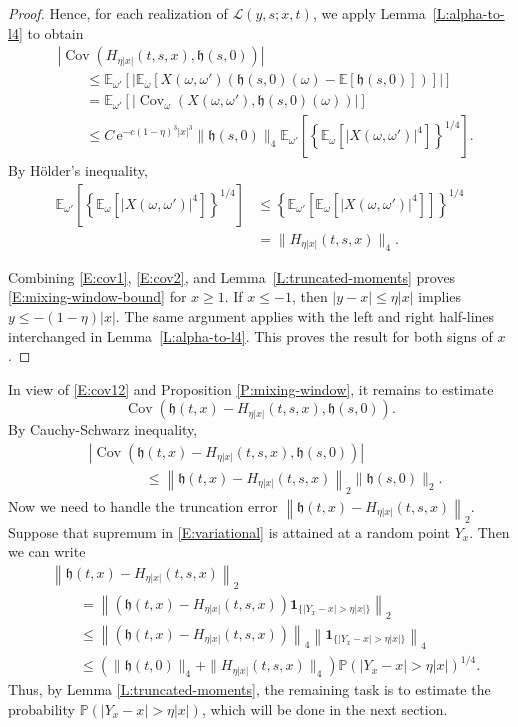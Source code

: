\documentclass[12pt, reqno]{amsart}
\numberwithin{equation}{section}
\theoremstyle{definition}
\newcommand{\E}{\mathbb{E}}
\newcommand{\h}{\mathfrak{h}}
\newcommand{\Cov}{\operatorname{Cov}}
\newcommand{\Prob}{\mathbb{P}}
\newcommand{\e}{\,\mathrm{e}}
\newcommand{\Lcal}{\mathcal{L}}
\newcommand{\one}{\mathbf{1}}
\begin{document}
\begin{proof}
           
  Hence, for each realization of $\Lcal(y,s;x,t)$, we apply
  Lemma~\ref{L:alpha-to-l4} to obtain
  \begin{align}
  &\left|\Cov(H_{\eta|x|}(t,s, x),\h(s,0))\right| \nonumber\\
  &\qquad \leq \E_{\omega'}\left[\left|\E_{\omega}\left[X(\omega, \omega') (\h(s,0)(\omega)-\E[\h(s,0)])\right]\right| \right] \nonumber\\
  &\qquad = \E_{\omega'} \left[\left|\Cov_{\omega} (X(\omega, \omega'), \h(s,0)(\omega))\right|\right]\nonumber\\
  &\qquad \leq C\e^{-c(1-\eta)^3|x|^3} \|\h(s,0)\|_4 \E_{\omega'}\left[
  \left\{\E_{\omega}\left[\left|X(\omega, \omega')\right|^4\right]\right\}^{1/4}
  \right]. \label{E:cov1}
  \end{align}
  By H\"older's inequality,
  \begin{align}
  \E_{\omega'}\left[
  \left\{\E_{\omega}\left[\left|X(\omega,\omega')\right|^4\right]\right\}^{1/4}
  \right] & \leq  \left\{\E_{\omega'}\left[
  \E_{\omega}\left[\left|X(\omega, \omega')\right|^4\right]
  \right] \right\}^{1/4} \nonumber\\
  &= \|H_{\eta|x|}(t,s, x)\|_4. \label{E:cov2}
  \end{align}
           
  Combining \eqref{E:cov1}, \eqref{E:cov2}, and
  Lemma~\ref{L:truncated-moments} proves \eqref{E:mixing-window-bound} for
  $x\ge1$. If $x\le-1$, then $|y-x|\le\eta|x|$ implies
  $y\le-(1-\eta)|x|$. The same argument applies with the left and right
  half-lines interchanged in Lemma~\ref{L:alpha-to-l4}. This proves the result
  for both signs of $x$.
\end{proof}

In view of \eqref{E:cov12} and Proposition \ref{P:mixing-window}, it remains to
estimate 
\[
  \Cov(\h(t,x)- H_{\eta |x|}(t,s,x), \h(s,0)).
\]
By Cauchy-Schwarz inequality, 
\begin{align*}
  & |\Cov(\h(t,x)- H_{\eta |x|}(t,s,x), \h(s,0))| \\
  & \qquad \qquad\leq \left\|\h(t,x)- H_{\eta |x|}(t,s,x)\right\|_2 \|\h(s,0)\|_2.
\end{align*}
Now we need to handle the truncation error $\left\|\h(t,x)- H_{\eta
|x|}(t,s,x)\right\|_2$. Suppose that supremum in \eqref{E:variational} is
attained at a random point $Y_x$. Then we can write
\begin{align}\label{E:optimizer}
&\left\|\h(t,x)- H_{\eta |x|}(t,s,x)\right\|_2 \nonumber \\
&\qquad=\left\|(\h(t,x)- H_{\eta |x|}(t,s,x)) \one_{\{|Y_x-x| >\eta|x|\}}\right\|_2\nonumber\\
&\qquad \leq \left\|(\h(t,x)- H_{\eta |x|}(t,s,x))\right\|_4 \left\|\one_{\{|Y_x-x| >\eta|x|\}}\right\|_4\nonumber\\
&\qquad \leq \left(\|\h(t,0)\|_4+\|H_{\eta|x|}(t,s,x)\|_4\right)
\Prob(|Y_x-x|>\eta|x|)^{1/4}.
\end{align}
Thus, by Lemma \ref{L:truncated-moments}, the remaining task is to estimate the
probability $\Prob(|Y_x-x| >\eta|x|)$, which will be done in the next section. 
\end{document}
